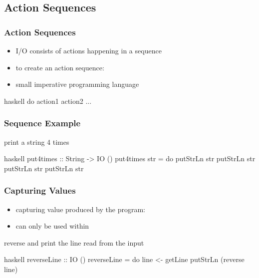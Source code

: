 \documentclass[dvipsnames]{beamer}
\theoremstyle{plain}
\begin{document}
\subsection{Action Sequences}

\begin{frame}[fragile]
  \frametitle{Action Sequences}

  \begin{itemize}
    \item I/O consists of \alert{actions} happening in a sequence
    \item to create an action sequence: 
    \item small imperative programming language
  \end{itemize}

  \begin{block}{}
    \begin{pygments}{haskell}
do action1
   action2
   ...
    \end{pygments}
  \end{block}
\end{frame}

\begin{frame}[fragile]
  \frametitle{Sequence Example}

  \begin{exampleblock}{print a string 4 times}
    \begin{pygments}{haskell}
put4times :: String -> IO ()
put4times str = do putStrLn str
                   putStrLn str
                   putStrLn str
                   putStrLn str
    \end{pygments}
  \end{exampleblock}
\end{frame}

\begin{frame}[fragile]
  \frametitle{Capturing Values}

  \begin{itemize}
    \item capturing value produced by the program: 
    \item can only be used within 
  \end{itemize}

  \begin{exampleblock}{reverse and print the line read from the input}
    \begin{pygments}{haskell}
reverseLine :: IO ()
reverseLine = do line <- getLine
                 putStrLn (reverse line)
    \end{pygments}
  \end{exampleblock}
\end{frame}
\end{document}
